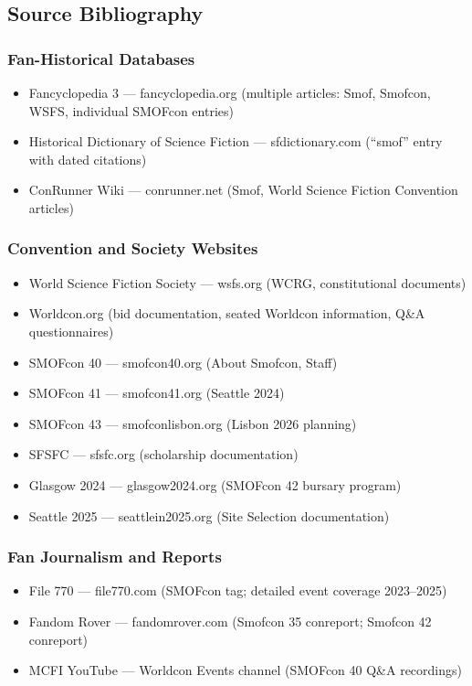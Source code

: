 \documentclass[11pt,letterpaper]{article}
\begin{document}
\subsection{Source Bibliography}

\subsubsection{Fan-Historical Databases}

\begin{itemize}[leftmargin=2em]
\item Fancyclopedia 3 --- fancyclopedia.org (multiple articles: Smof, Smofcon, WSFS, individual SMOFcon entries)
\item Historical Dictionary of Science Fiction --- sfdictionary.com (``smof'' entry with dated citations)
\item ConRunner Wiki --- conrunner.net (Smof, World Science Fiction Convention articles)
\end{itemize}

\subsubsection{Convention and Society Websites}

\begin{itemize}[leftmargin=2em]
\item World Science Fiction Society --- wsfs.org (WCRG, constitutional documents)
\item Worldcon.org (bid documentation, seated Worldcon information, Q\&A questionnaires)
\item SMOFcon 40 --- smofcon40.org (About Smofcon, Staff)
\item SMOFcon 41 --- smofcon41.org (Seattle 2024)
\item SMOFcon 43 --- smofconlisbon.org (Lisbon 2026 planning)
\item SFSFC --- sfsfc.org (scholarship documentation)
\item Glasgow 2024 --- glasgow2024.org (SMOFcon 42 bursary program)
\item Seattle 2025 --- seattlein2025.org (Site Selection documentation)
\end{itemize}

\subsubsection{Fan Journalism and Reports}

\begin{itemize}[leftmargin=2em]
\item File 770 --- file770.com (SMOFcon tag; detailed event coverage 2023--2025)
\item Fandom Rover --- fandomrover.com (Smofcon 35 conreport; Smofcon 42 conreport)
\item MCFI YouTube --- Worldcon Events channel (SMOFcon 40 Q\&A recordings)
\end{itemize}
\end{document}

